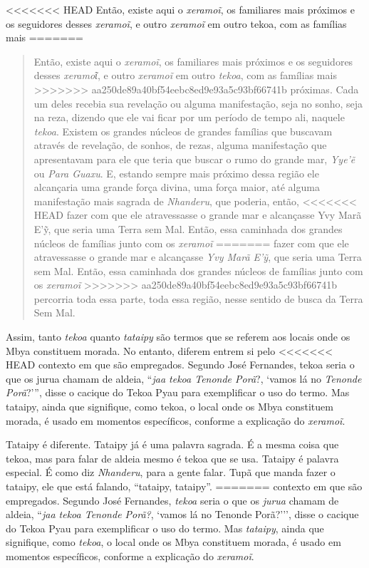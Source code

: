 <<<<<<< HEAD
Então, existe aqui o \emph{xeramoĩ}, os familiares mais
próximos e os seguidores desses \emph{xeramoĩ}, e outro
\emph{xeramoĩ} em outro tekoa, com as famílias mais
=======
\begin{quote}
Então, existe aqui o \emph{xeramo\~{i}}, os familiares mais
próximos e os seguidores desses \emph{xeramoῖ}, e outro
\emph{xeramo\~{i}} em outro \emph{tekoa}, com as famílias mais
>>>>>>> aa250de89a40bf54eebc8ed9e93a5c93bf66741b
próximas. Cada um deles recebia sua revelação ou alguma manifestação,
seja no sonho, seja na reza, dizendo que ele vai ficar por um período
de tempo ali, naquele \emph{tekoa}. Existem os grandes núcleos de grandes
famílias que buscavam através de revelação, de sonhos, de rezas, alguma
manifestação que apresentavam para ele que teria que buscar o rumo do
grande mar, \emph{Yye’\~{e}} ou \emph{Para Guaxu}. E, estando sempre mais próximo
dessa região ele alcançaria uma grande força divina, uma força maior,
até alguma manifestação mais sagrada de \emph{Nhanderu}, que poderia, então,
<<<<<<< HEAD
fazer com que ele atravessasse o grande mar e alcançasse Yvy Marã
E’\~{y}, que seria uma Terra sem Mal. Então, essa caminhada dos grandes
núcleos de famílias junto com os \emph{xeramoĩ}
=======
fazer com que ele atravessasse o grande mar e alcançasse \emph{Yvy Marã
E’\~{y}}, que seria uma Terra sem Mal. Então, essa caminhada dos grandes
núcleos de famílias junto com os \emph{xeramo\~{i}}
>>>>>>> aa250de89a40bf54eebc8ed9e93a5c93bf66741b
percorria toda essa parte, toda essa região, nesse sentido de busca da
Terra Sem Mal.
\end{quote}

Assim, tanto \emph{tekoa} quanto \emph{tataipy} são termos que se referem aos locais
onde os Mbya constituem morada. No entanto, diferem entrem si pelo
<<<<<<< HEAD
contexto em que são empregados. Segundo José Fernandes, tekoa seria o
que os jurua chamam de aldeia, ``\emph{jaa tekoa Tenonde Porã}?, ‘vamos lá no
\emph{Tenonde Porã}?’'', disse o cacique do Tekoa Pyau para exemplificar o uso
do termo. Mas tataipy, ainda que signifique, como tekoa, o local onde
os Mbya constituem morada, é usado em momentos específicos, conforme a
explicação do \emph{xeramoĩ}. 

Tataipy é diferente. Tataipy já é uma palavra sagrada. É a mesma coisa
que tekoa, mas para falar de aldeia mesmo é tekoa que se usa. Tataipy é
palavra especial. É como diz \emph{Nhanderu}, para a gente falar. Tupã que
manda fazer o tataipy, ele que está falando, ``tataipy, tataipy''.
=======
contexto em que são empregados. Segundo José Fernandes, \emph{tekoa} seria o
que os \emph{jurua} chamam de aldeia, ``\emph{jaa tekoa Tenonde Porã?}, `vamos lá no
Tenonde Porã?’'', disse o cacique do Tekoa Pyau para exemplificar o uso
do termo. Mas \emph{tataipy}, ainda que signifique, como \emph{tekoa}, o local onde
os Mbya constituem morada, é usado em momentos específicos, conforme a
explicação do \emph{xeramo\~{i}}. 

